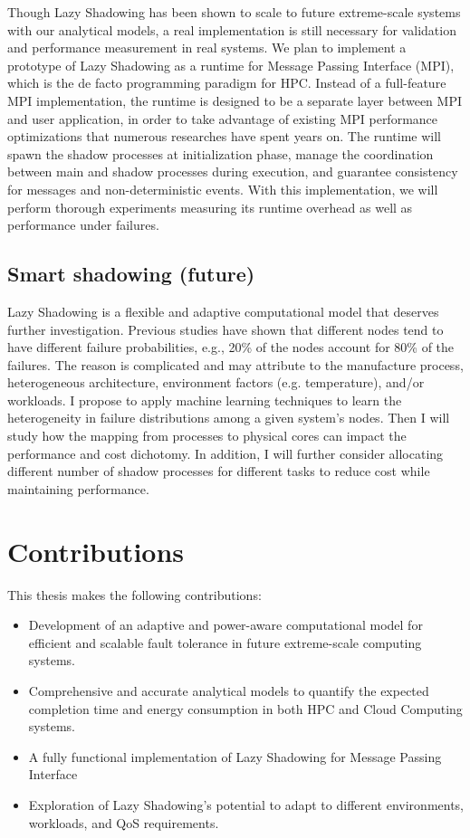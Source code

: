 Though Lazy Shadowing has been shown to scale to future extreme-scale systems with our analytical models, a real implementation 
is still necessary for validation and performance measurement in real systems. We plan to implement a prototype of Lazy 
Shadowing as a runtime for Message Passing Interface (MPI), which is the de facto programming paradigm for HPC. Instead of 
a full-feature MPI implementation, the runtime is designed to be a separate layer between MPI and user application, in order 
to take advantage of existing MPI performance optimizations that numerous researches have spent years on. The runtime will spawn 
the shadow processes at initialization phase, manage the coordination between main and shadow processes during execution, 
and guarantee consistency for messages and non-deterministic events. With this implementation, we will perform thorough 
experiments measuring its runtime overhead as well as performance under failures.

\subsection{Smart shadowing (future)}
Lazy Shadowing is a flexible and adaptive computational model that deserves further investigation. Previous studies have shown that 
different nodes tend to have different failure probabilities, e.g., 20\% of the nodes account for 80\% of the failures. The reason 
is complicated and may attribute to the manufacture process, heterogeneous architecture, environment factors (e.g. temperature), 
and/or workloads. I propose to apply machine learning techniques to learn the heterogeneity in failure distributions among a given 
system's nodes. Then I will study how the mapping from processes to physical cores can impact the performance and cost dichotomy. 
In addition, I will further consider allocating different number of shadow processes for different tasks to reduce cost while 
maintaining performance. 

\section{Contributions}
This thesis makes the following contributions:

\begin{itemize}
\item Development of an adaptive and power-aware computational model for efficient and scalable fault tolerance in future extreme-scale 
computing systems.
\item Comprehensive and accurate analytical models to quantify the expected completion time and energy consumption in both HPC and Cloud Computing systems.
\item A fully functional implementation of Lazy Shadowing for Message Passing Interface
\item Exploration of Lazy Shadowing's potential to adapt to different environments, workloads, and QoS requirements. 
\end{itemize}


